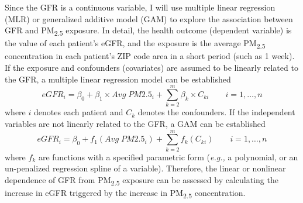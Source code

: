 \documentclass[11pt]{article}
\newcommand{\tsub}{\textsubscript}
\begin{document}
\begin{enumerate*}[{[a)]}]
    \item Since the GFR is a continuous variable, I will use multiple linear regression (MLR) or generalized additive model (GAM) to explore the association between GFR and PM\tsub{2.5} exposure. In detail, the health outcome (dependent variable) is the value of each patient's eGFR, and the exposure is the average PM\tsub{2.5} concentration in each patient's ZIP code area in a short period (such as 1 week). If the exposure and confounders (covariates) are assumed to be linearly related to the GFR, a multiple linear regression model can be established
    \begin{equation*}
        eGFR_i = \beta_0 + \beta_1 \times Avg\;PM2.5_i + \sum_{k=2}^m\beta_k\times C_{ki} \qquad i = 1,\ldots, n
    \end{equation*}
    where $i$ denotes each patient and $C_{k}$ denotes the confounders. If the independent variables are not linearly related to the GFR, a GAM can be established
    \begin{equation*}
        eGFR_i = \beta_0 + f_1(Avg\;PM2.5_i) + \sum_{k=2}^mf_k(C_{ki}) \qquad i = 1,\ldots, n
    \end{equation*}
    where $f_k$ are functions with a specified parametric form (\textit{e.g.,} a polynomial, or an un-penalized regression spline of a variable). Therefore, the linear or nonlinear dependence of GFR from PM\tsub{2.5} exposure can be assessed by calculating the increase in eGFR triggered by the increase in PM\tsub{2.5} concentration.
\end{enumerate*}
\end{document}
